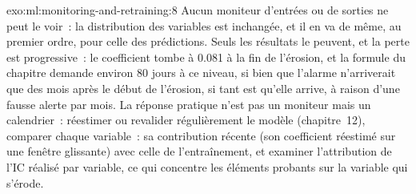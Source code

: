 \begin{solution}{exo:ml:monitoring-and-retraining:8}
Aucun moniteur d'entrées ou de sorties ne peut le voir~: la distribution des variables est inchangée, et il en va de même, au premier ordre, pour celle des
prédictions. Seuls les résultats le peuvent, et la perte est progressive~: le coefficient tombe à 0.081 à la fin de l'érosion, et la formule du chapitre
demande environ 80 jours à ce niveau, si bien que l'alarme n'arriverait que des mois après le début de l'érosion, si tant est qu'elle arrive, à raison d'une fausse alerte par
mois. La réponse pratique n'est pas un moniteur mais un calendrier~: réestimer ou revalider régulièrement le modèle (chapitre~12), comparer chaque
variable~: sa contribution récente (son coefficient réestimé sur une fenêtre glissante) avec celle de l'entraînement, et examiner l'attribution de
l'IC réalisé par variable, ce qui concentre les éléments probants sur la variable qui s'érode.
\end{solution}

